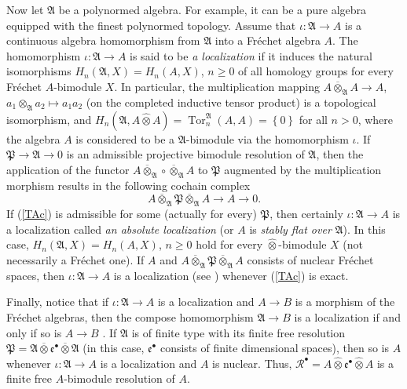\documentclass[12pt]{amsart}%
\theoremstyle{plain}
\numberwithin{equation}{section}
\numberwithin{equation}{section}
\numberwithin{theorem}{section}
\numberwithin{lemma}{section}
\numberwithin{remark}{section}
\numberwithin{example}{section}
\numberwithin{proposition}{section}
\numberwithin{definition}{section}
\numberwithin{corollary}{section}
\begin{document}
Now let $\mathfrak{A}$ be a polynormed algebra. For example, it can be a pure
algebra equipped with the finest polynormed topology. Assume that
$\iota:\mathfrak{A}\rightarrow A$ is a continuous algebra homomorphism from
$\mathfrak{A}$ into a Fr\'{e}chet algebra $A$. The homomorphism $\iota
:\mathfrak{A}\rightarrow A$ is said to be \textit{a localization} if it
induces the natural isomorphisms $H_{n}\left(  \mathfrak{A},X\right)
=H_{n}\left(  A,X\right)  $, $n\geq0$ of all homology groups for every
Fr\'{e}chet $A$-bimodule $X$. In particular, the multiplication mapping
$A\overline{\otimes}_{\mathfrak{A}}A\rightarrow A$, $a_{1}\otimes
_{\mathfrak{A}}a_{2}\mapsto a_{1}a_{2}$ (on the completed inductive tensor
product) is a topological isomorphism, and $H_{n}\left(  \mathfrak{A}%
,A\widehat{\otimes}A\right)  =\operatorname{Tor}_{n}^{\mathfrak{A}}\left(
A,A\right)  =\left\{  0\right\}  $ for all $n>0$, where the algebra $A$ is
considered to be a $\mathfrak{A}$-bimodule via the homomorphism $\iota$. If
$\mathfrak{P}\rightarrow\mathfrak{A}\rightarrow0$ is an admissible projective
bimodule resolution of $\mathfrak{A}$, then the application of the functor
$A\overline{\otimes}_{\mathfrak{A}}\circ\overline{\otimes}_{\mathfrak{A}}A$ to
$\mathfrak{P}$ augmented by the multiplication morphism results in the
following cochain complex
\begin{equation}
A\overline{\otimes}_{\mathfrak{A}}\mathfrak{P}\overline{\otimes}%
_{\mathfrak{A}}A\longrightarrow A\rightarrow0. \label{TAc}%
\end{equation}
If (\ref{TAc}) is admissible for some (actually for every) $\mathfrak{P}$,
then certainly $\iota:\mathfrak{A}\rightarrow A$ is a localization called
\textit{an absolute localization }(or $A$ is \textit{stably flat over}
$\mathfrak{A}$). In this case, $H_{n}\left(  \mathfrak{A},X\right)
=H_{n}\left(  A,X\right)  $, $n\geq0$ hold for every $\widehat{\otimes}%
$-bimodule $X$ (not necessarily a Fr\'{e}chet one). If $A$ and $A\overline
{\otimes}_{\mathfrak{A}}\mathfrak{P}\overline{\otimes}_{\mathfrak{A}}A$
consists of nuclear Fr\'{e}chet spaces, then $\iota:\mathfrak{A}\rightarrow A$
is a localization (see \cite[Proposition 1.6]{Tay2}) whenever (\ref{TAc}) is exact.

Finally, notice that if $\iota:\mathfrak{A}\rightarrow A$ is a localization
and $A\rightarrow B$ is a morphism of the Fr\'{e}chet algebras, then the
compose homomorphism $\mathfrak{A}\rightarrow B$ is a localization if and only
if so is $A\rightarrow B$ \cite[Proposition 1.8]{Tay2}. If $\mathfrak{A}$ is
of finite type with its finite free resolution $\mathfrak{P}=\mathfrak{A}%
\overline{\otimes}\mathfrak{e}^{\bullet}\overline{\otimes}\mathfrak{A}$ (in
this case, $\mathfrak{e}^{\bullet}$ consists of finite dimensional spaces),
then so is $A$ whenever $\iota:\mathfrak{A}\rightarrow A$ is a localization
and $A$ is nuclear. Thus, $\mathcal{R}^{\bullet}=A\widehat{\otimes
}\mathfrak{e}^{\bullet}\widehat{\otimes}A$ is a finite free $A$-bimodule
resolution of $A$.
\end{document}
